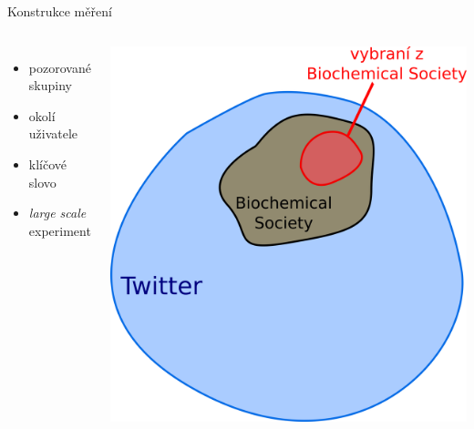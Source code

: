 \documentclass[notheorems,12pt]{beamer}
\begin{document}
\begin{frame}{Konstrukce měření}
    \begin{columns}
    \column{5cm}
    	\begin{itemize}
    		\item pozorované skupiny
    		\item okolí uživatele
    		\item klíčové slovo
    		\item \textit{large scale} experiment
    	\end{itemize}
    \column{6cm}
    	\center
    	\includegraphics[scale=0.32]{./Pics/sets.png}
    \end{columns}
\end{frame}
\end{document}
